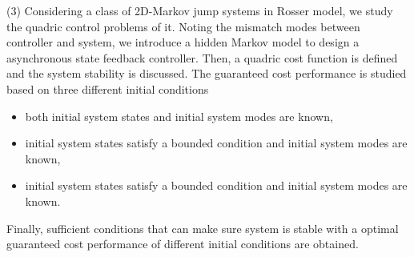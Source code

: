 \begin{eabstract}
(3) Considering a class of 2D-Markov jump systems in Rosser model, we study the quadric control problems of it. Noting the mismatch modes between controller and system, we introduce a hidden Markov model to design a asynchronous state feedback controller. Then, a quadric cost function is defined and the system stability is discussed. The guaranteed cost performance is studied based on three different initial conditions
 
 \begin{itemize}
 	\item  both initial system states  and initial system modes are known,
 	\item  initial system states satisfy a bounded condition and initial system modes are known,
 	\item  initial system states satisfy a bounded condition and initial system modes are known.
 \end{itemize}
 Finally,  sufficient conditions that can make sure system is stable with a optimal guaranteed cost performance  of different initial conditions are obtained.


\end{eabstract}

